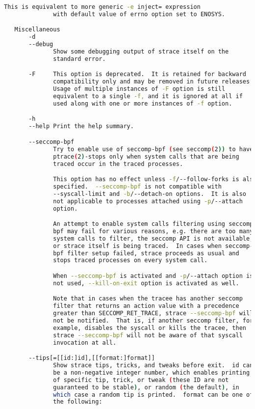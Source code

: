 {{\begin{lstlisting}[language=bash]
              This is equivalent to more generic -e inject= expression
              with default value of errno option set to ENOSYS.

   Miscellaneous
       -d
       --debug
              Show some debugging output of strace itself on the
              standard error.

       -F     This option is deprecated.  It is retained for backward
              compatibility only and may be removed in future releases.
              Usage of multiple instances of -F option is still
              equivalent to a single -f, and it is ignored at all if
              used along with one or more instances of -f option.

       -h
       --help Print the help summary.

       --seccomp-bpf
              Try to enable use of seccomp-bpf (see seccomp(2)) to have
              ptrace(2)-stops only when system calls that are being
              traced occur in the traced processes.

              This option has no effect unless -f/--follow-forks is also
              specified.  --seccomp-bpf is not compatible with
              --syscall-limit and -b/--detach-on options.  It is also
              not applicable to processes attached using -p/--attach
              option.

              An attempt to enable system calls filtering using seccomp-
              bpf may fail for various reasons, e.g. there are too many
              system calls to filter, the seccomp API is not available,
              or strace itself is being traced.  In cases when seccomp-
              bpf filter setup failed, strace proceeds as usual and
              stops traced processes on every system call.

              When --seccomp-bpf is activated and -p/--attach option is
              not used, --kill-on-exit option is activated as well.

              Note that in cases when the tracee has another seccomp
              filter that returns an action value with a precedence
              greater than SECCOMP_RET_TRACE, strace --seccomp-bpf will
              not be notified.  That is, if another seccomp filter, for
              example, disables the syscall or kills the tracee, then
              strace --seccomp-bpf will not be aware of that syscall
              invocation at all.

       --tips[=[[id:]id],[[format:]format]]
              Show strace tips, tricks, and tweaks before exit.  id can
              be a non-negative integer number, which enables printing
              of specific tip, trick, or tweak (these ID are not
              guaranteed to be stable), or random (the default), in
              which case a random tip is printed.  format can be one of
              the following:


\end{lstlisting}}}
